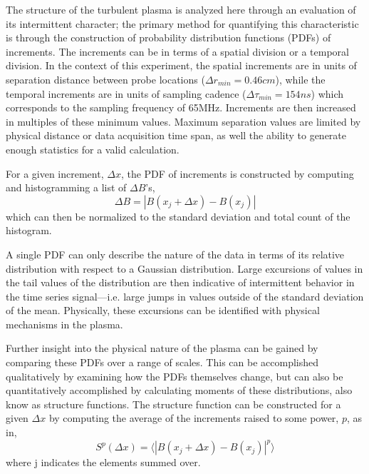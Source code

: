 \documentclass[aps,prl,amsmath,amssymb,reprint,superscriptaddress]{revtex4-1} %
\begin{document}
The structure of the turbulent plasma is analyzed here through an evaluation of its intermittent character; the primary method for quantifying this characteristic is through the construction of probability distribution functions (PDFs) of increments. The increments can be in terms of a spatial division or a temporal division. In the context of this experiment, the spatial increments are in units of separation distance between probe locations ($\Delta r_{min} = 0.46cm$), while the temporal increments are in units of sampling cadence ($\Delta \tau_{min} = 154ns$) which corresponds to the sampling frequency of 65MHz. Increments are then increased in multiples of these minimum values. Maximum separation values are limited by physical distance or data acquisition time span, as well the ability to generate enough statistics for a valid calculation.

For a given increment, $\Delta x$, the PDF of increments is constructed by computing and histogramming a list of $\Delta B$'s,
\begin{equation}
\Delta B = |B(x_{j}+\Delta x)-B(x_{j})|
\label{eq:increment}
\end{equation}
which can then be normalized to the standard deviation and total count of the histogram.

A single PDF can only describe the nature of the data in terms of its relative distribution with respect to a Gaussian distribution. Large excursions of values in the tail values of the distribution are then indicative of intermittent behavior in the time series signal---i.e. large jumps in values outside of the standard deviation of the mean. Physically, these excursions can be identified with physical mechanisms in the plasma.

Further insight into the physical nature of the plasma can be gained by comparing these PDFs over a range of scales. This can be accomplished qualitatively by examining how the PDFs themselves change, but can also be quantitatively accomplished by calculating moments of these distributions, also know as structure functions. The structure function can be constructed for a given $\Delta x$ by computing the average of the increments raised to some power, $p$, as in,
\begin{equation}
S^{p}(\Delta x) = \langle|B(x_{j}+\Delta x)-B(x_{j})|^{p}\rangle
\label{eq:structfunc}
\end{equation}
where j indicates the elements summed over. 
\end{document}
